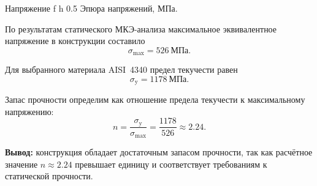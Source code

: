     {Напряжение} %
    {f} %
    {h} %
    {0.5\textwidth} %
    {Эпюра напряжений, МПа.} %

\newpage

По результатам статического МКЭ-анализа максимальное эквивалентное напряжение в конструкции составило
\[
\sigma_{\max} = 526\ \text{МПа}.
\]

Для выбранного материала AISI~4340 предел текучести равен
\[
\sigma_{\text{y}} = 1178\ \text{МПа}.
\]

Запас прочности определим как отношение предела текучести к максимальному напряжению:
\[
n = \frac{\sigma_{\text{y}}}{\sigma_{\max}} =
\frac{1178}{526} \approx 2.24.
\]

\textbf{Вывод:} конструкция обладает достаточным запасом прочности, так как расчётное значение \( n \approx 2.24 \) превышает единицу и соответствует требованиям к статической прочности.